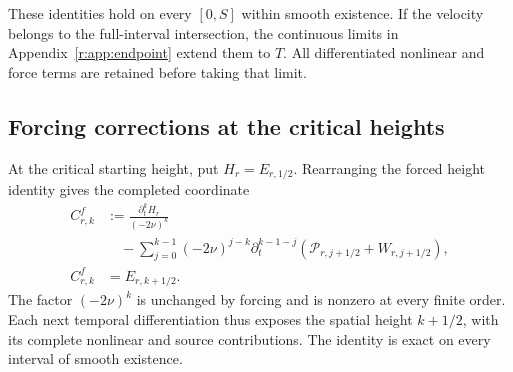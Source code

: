 These identities hold on every \([0,S]\) within smooth existence.
If the velocity belongs to the full-interval intersection, the continuous
limits in Appendix~\ref{r:app:endpoint} extend them to \(T\). All differentiated
nonlinear and force terms are retained before taking that limit.




\subsection{Forcing corrections at the critical heights}

At the critical starting height, put \(H_r=E_{r,1/2}\). Rearranging the
forced height identity gives the completed coordinate
\begin{equation}
 \begin{aligned}
 C^f_{r,k}&:=\frac{\partial_t^kH_r}{(-2\nu)^k}\\
 &\quad-\sum_{j=0}^{k-1}(-2\nu)^{j-k}\partial_t^{k-1-j}
 (\mathcal P_{r,j+1/2}+W_{r,j+1/2}),\\
 C^f_{r,k}&=E_{r,k+1/2}.
 \end{aligned}
 \label{r:eq:forced-completion}
\end{equation}
The factor \((-2\nu)^k\) is unchanged by forcing and is nonzero at every
finite order. Each next temporal differentiation thus exposes the spatial
height \(k+1/2\), with its complete nonlinear and source contributions.
The identity is exact on every interval of smooth existence.


